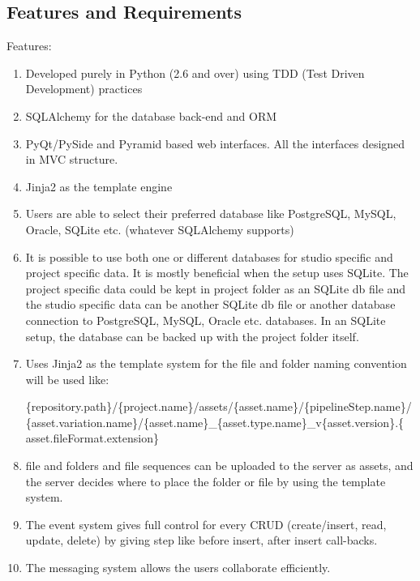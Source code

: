 \documentclass[a4paper,10pt,english]{sphinxmanual}
\begin{document}
\subsection{Features and Requirements}
\label{design:features-and-requirements}
Features:
\begin{enumerate}
\item {} 
Developed purely in Python (2.6 and over) using TDD (Test Driven
Development) practices

\item {} 
SQLAlchemy for the database back-end and ORM

\item {} 
PyQt/PySide and Pyramid based web interfaces. All the interfaces designed
in MVC structure.

\item {} 
Jinja2 as the template engine

\item {} 
Users are able to select their preferred database like PostgreSQL, MySQL,
Oracle, SQLite etc. (whatever SQLAlchemy supports)

\item {} 
It is possible to use both one or different databases for studio specific
and project specific data. It is mostly beneficial when the setup uses
SQLite. The project specific data could be kept in project folder as an
SQLite db file and the studio specific data can be another SQLite db file
or another database connection to PostgreSQL, MySQL, Oracle etc. databases.
In an SQLite setup, the database can be backed up with the project folder
itself.

\item {} 
Uses Jinja2 as the template system for the file and folder naming
convention will be used like:

\{repository.path\}/\{project.name\}/assets/\{asset.name\}/\{pipelineStep.name\}/
\{asset.variation.name\}/\{asset.name\}\_\{asset.type.name\}\_v\{asset.version\}.\{
asset.fileFormat.extension\}

\item {} 
file and folders and file sequences can be uploaded to the server as
assets, and the server decides where to place the folder or file by using
the template system.

\item {} 
The event system gives full control for every CRUD (create/insert, read,
update, delete) by giving step like before insert, after insert
call-backs.

\item {} 
The messaging system allows the users collaborate efficiently.

\end{enumerate}
\end{document}
